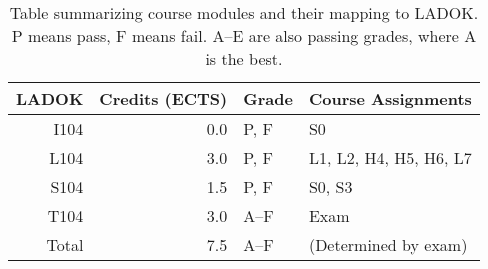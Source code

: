 \begin{table}
  \centering
  \setlength{\tabcolsep}{0.5em}
  \begin{tabular}{rrll}
    \toprule
    \textbf{LADOK}
    & \textbf{Credits (ECTS)}
    & \textbf{Grade}
    & \textbf{Course Assignments}
    \\
    \midrule
    I104  & 0.0             & P, F        & S0\\
    L104  & 3.0             & P, F        & L1, L2, H4, H5, H6, L7\\
    S104  & 1.5             & P, F        & S0, S3\\
    T104  & 3.0             & A--F        & Exam\\
    \midrule
    Total & 7.5             & A--F        & (Determined by exam)\\
    \bottomrule
  \end{tabular}
  \caption{%
    Table summarizing course modules and their mapping to LADOK\@.
    P means pass, F means fail.
    A--E are also passing grades, where A is the best.
  }\label{LADOKTable}
\end{table}
